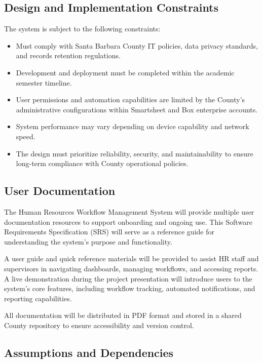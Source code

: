 \documentclass[12pt]{article}
\begin{document}

\subsection{Design and Implementation Constraints}

The system is subject to the following constraints:

\begin{itemize}
    \item Must comply with Santa Barbara County IT policies, data privacy standards, and records retention regulations.
    \item Development and deployment must be completed within the academic semester timeline.
    \item User permissions and automation capabilities are limited by the County’s administrative configurations within Smartsheet and Box enterprise accounts.
    \item System performance may vary depending on device capability and network speed.
    \item The design must prioritize reliability, security, and maintainability to ensure long-term compliance with County operational policies.
\end{itemize}

\subsection{User Documentation}

The Human Resources Workflow Management System will provide multiple user documentation resources to support onboarding and ongoing use. This Software Requirements Specification (SRS) will serve as a reference guide for understanding the system’s purpose and functionality.

A user guide and quick reference materials will be provided to assist HR staff and supervisors in navigating dashboards, managing workflows, and accessing reports. A live demonstration during the project presentation will introduce users to the system’s core features, including workflow tracking, automated notifications, and reporting capabilities.

All documentation will be distributed in PDF format and stored in a shared County repository to ensure accessibility and version control.

\subsection{Assumptions and Dependencies}
\end{document}
